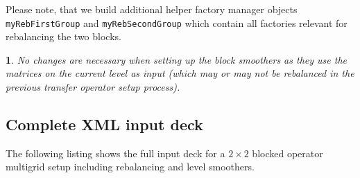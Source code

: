 \documentclass[10pt,fleqn]{book}
\newtheorem*{mycomment}{\ding{42}}
\begin{document}
Please note, that we build additional helper factory manager objects \texttt{myRebFirstGroup} and \texttt{myRebSecondGroup} which contain all factories relevant for rebalancing the two blocks.

\begin{mycomment}
No changes are necessary when setting up the block smoothers as they use the matrices on the current level as input (which may or may not be rebalanced in the previous transfer operator setup process).
\end{mycomment}

\subsection{Complete XML input deck}

The following listing shows the full input deck for a $2\times 2$ blocked operator multigrid setup including rebalancing and level smoothers.

\label{sec:xmlinputdeckrebalancing}
\end{document}
